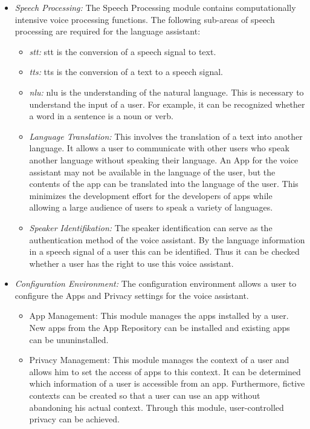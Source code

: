 \begin{itemize}
	\item \textsl{Speech Processing:} The Speech Processing module contains computationally intensive voice processing functions. The following sub-areas of speech processing are required for the language assistant:
	\begin{itemize}
		\item \textsl{\ac{stt}:} \ac{stt} is the conversion of a speech signal to text.
		\item \textsl{\ac{tts}:} \ac{tts} is the conversion of a text to a speech signal.
		\item \textsl{\ac{nlu}:} \ac{nlu} is the understanding of the natural language. This is necessary to understand the input of a user. For example, it can be recognized whether a word in a sentence is a noun or verb.
		\item \textsl{Language Translation:} This involves the translation of a text into another language. It allows a user to communicate with other users who speak another language without speaking their language. An App for the voice assistant may not be available in the language of the user, but the contents of the app can be translated into the language of the user. This minimizes the development effort for the developers of apps while allowing a large audience of users to speak a variety of languages.
		\item \textsl{Speaker Identifikation:} The speaker identification can serve as the authentication method of the voice assistant. By the language information in a speech signal of a user this can be identified. Thus it can be checked whether a user has the right to use this voice assistant.
	\end{itemize}
	\item \textsl{Configuration Environment:} The configuration environment allows a user to configure the Apps and Privacy settings for the voice assistant.
	\begin{itemize}
		\item App Management: This module manages the apps installed by a user. New apps from the App Repository can be installed and existing apps can be ununinstalled.
		\item Privacy Management: This module manages the context of a user and allows him to set the access of apps to this context. It can be determined which information of a user is accessible from an app. Furthermore, fictive contexts can be created so that a user can use an app without abandoning his actual context. Through this module, user-controlled privacy can be achieved. 
	\end{itemize}	
\end{itemize}





